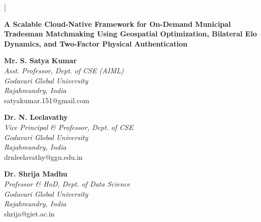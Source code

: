 \documentclass[10pt,twocolumn,a4paper]{article}
\begin{document}
\twocolumn[{
  \begin{center}
    {\Large \textbf{A Scalable Cloud-Native Framework for On-Demand Municipal Tradesman Matchmaking Using Geospatial Optimization, Bilateral Elo Dynamics, and Two-Factor Physical Authentication} \par}
    \vspace{1.5em}

    \begin{minipage}[t]{0.31\textwidth}
      \centering
      \textbf{Mr. S. Satya Kumar}\\
      \textit{Asst. Professor, Dept. of CSE (AIML)}\\
      \textit{Godavari Global University}\\
      \textit{Rajahmundry, India}\\
      satyakumar.151@gmail.com
    \end{minipage}
    \hfill
    \begin{minipage}[t]{0.31\textwidth}
      \centering
      \textbf{Dr. N. Leelavathy}\\
      \textit{Vice Principal \& Professor, Dept. of CSE}\\
      \textit{Godavari Global University}\\
      \textit{Rajahmundry, India}\\
      drnleelavathy@ggu.edu.in
    \end{minipage}
    \hfill
    \begin{minipage}[t]{0.31\textwidth}
      \centering
      \textbf{Dr. Shrija Madhu}\\
      \textit{Professor \& HoD, Dept. of Data Science}\\
      \textit{Godavari Global University}\\
      \textit{Rajahmundry, India}\\
      shrija@giet.ac.in
    \end{minipage}

    \vspace{1.3em}


\end{center}}
\end{document}
